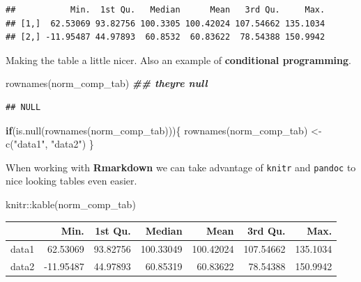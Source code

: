 \documentclass[
]{book}
\newenvironment{Shaded}{\begin{snugshade}}{\end{snugshade}}
\newcommand{\ControlFlowTok}[1]{\textcolor[rgb]{0.13,0.29,0.53}{\textbf{#1}}}
\newcommand{\DocumentationTok}[1]{\textcolor[rgb]{0.56,0.35,0.01}{\textbf{\textit{#1}}}}
\newcommand{\FunctionTok}[1]{\textcolor[rgb]{0.00,0.00,0.00}{#1}}
\newcommand{\NormalTok}[1]{#1}
\newcommand{\OtherTok}[1]{\textcolor[rgb]{0.56,0.35,0.01}{#1}}
\newcommand{\SpecialCharTok}[1]{\textcolor[rgb]{0.00,0.00,0.00}{#1}}
\newcommand{\StringTok}[1]{\textcolor[rgb]{0.31,0.60,0.02}{#1}}
\begin{document}
\begin{verbatim}
##           Min.  1st Qu.   Median      Mean   3rd Qu.     Max.
## [1,]  62.53069 93.82756 100.3305 100.42024 107.54662 135.1034
## [2,] -11.95487 44.97893  60.8532  60.83622  78.54388 150.9942
\end{verbatim}

Making the table a little nicer. Also an example of \textbf{conditional programming}.

\begin{Shaded}
\begin{Highlighting}[]
\FunctionTok{rownames}\NormalTok{(norm\_comp\_tab) }\DocumentationTok{\#\# they\textquotesingle{}re null}
\end{Highlighting}
\end{Shaded}

\begin{verbatim}
## NULL
\end{verbatim}

\begin{Shaded}
\begin{Highlighting}[]
\ControlFlowTok{if}\NormalTok{(}\FunctionTok{is.null}\NormalTok{(}\FunctionTok{rownames}\NormalTok{(norm\_comp\_tab)))\{}
  \FunctionTok{rownames}\NormalTok{(norm\_comp\_tab) }\OtherTok{\textless{}{-}} \FunctionTok{c}\NormalTok{(}\StringTok{"data1"}\NormalTok{, }\StringTok{"data2"}\NormalTok{)}
\NormalTok{\}}
\end{Highlighting}
\end{Shaded}

When working with \textbf{Rmarkdown} we can take advantage of \texttt{knitr} and \texttt{pandoc} to nice looking tables even easier.

\begin{Shaded}
\begin{Highlighting}[]
\NormalTok{knitr}\SpecialCharTok{::}\FunctionTok{kable}\NormalTok{(norm\_comp\_tab)}
\end{Highlighting}
\end{Shaded}

\begin{tabular}{l|r|r|r|r|r|r}
\hline
  & Min. & 1st Qu. & Median & Mean & 3rd Qu. & Max.\\
\hline
data1 & 62.53069 & 93.82756 & 100.33049 & 100.42024 & 107.54662 & 135.1034\\
\hline
data2 & -11.95487 & 44.97893 & 60.85319 & 60.83622 & 78.54388 & 150.9942\\
\hline
\end{tabular}
\end{document}
